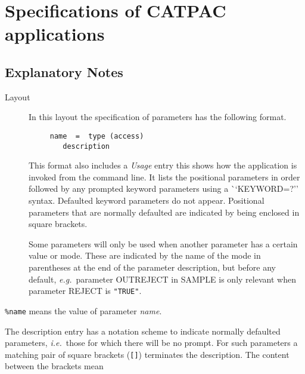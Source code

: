 \newpage
\section{Specifications of CATPAC applications}
\label{ap:full}
\subsection{Explanatory Notes}

\begin{description}

\item [Layout]
In this layout the specification of parameters has the following
format.

\begin{verbatim}
     name  =  type (access)
        description
\end{verbatim}

This format also includes a {\em Usage} entry this shows how the
application is invoked from the command line.   It lists the positional
parameters in order followed by any prompted keyword parameters using
a {\mbox ``KEYWORD=?''} syntax.  Defaulted
keyword parameters do not appear.  Positional parameters
that are normally defaulted are indicated by being enclosed in square
brackets.

Some parameters will only be used when another parameter has a certain
value or mode. These are indicated by the name of the mode in
parentheses at the end of the parameter description, but before any
default, {\it e.g.}\ parameter OUTREJECT in SAMPLE is only
relevant when parameter REJECT is {\tt "TRUE"}.

\end {description}

\newcommand {\mantt}{\tt}

{\mantt \%name} means the value of parameter {\it name}.

The description entry has a notation scheme to indicate
normally defaulted parameters, {\it i.e.}\ those for which there will
be no prompt.
For such parameters a matching pair of square brackets ({\mantt []})
terminates the description.  The content between the brackets mean


